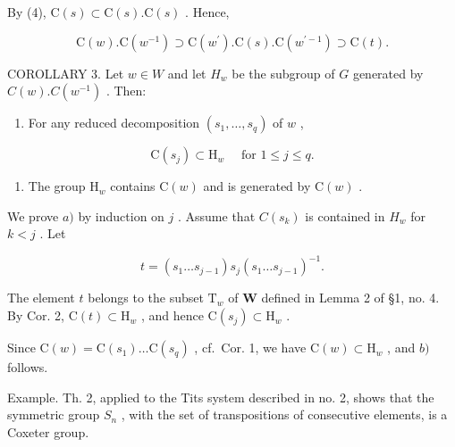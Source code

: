 By (4), \(\mathrm{C}(s) \subset \mathrm{C}(s). \mathrm{C}(s)\) . Hence,

\[
\mathrm{C} (w). \mathrm{C} (w ^ {- 1}) \supset \mathrm{C} (w ^ {\prime}). \mathrm{C} (s). \mathrm{C} (w ^ {\prime - 1}) \supset \mathrm{C} (t).
\]

COROLLARY 3. Let \(w \in W\) and let \(H_w\) be the subgroup of \(G\) generated by \(C(w).C(w^{-1})\) . Then:

\begin{enumerate}
\def\labelenumi{\alph{enumi})}
\tightlist
\item
  For any reduced decomposition \((s_1,\ldots ,s_q)\) of \(w\) ,
\end{enumerate}

\[
\mathrm{C} (s _ {j}) \subset \mathrm{H} _ {w} \quad \text { for } 1 \leqslant j \leqslant q.
\]

\begin{enumerate}
\def\labelenumi{\alph{enumi})}
\setcounter{enumi}{1}
\tightlist
\item
  The group \(\mathrm{H}_w\) contains \(\mathrm{C}(w)\) and is generated by \(\mathrm{C}(w)\) .
\end{enumerate}

We prove \(a)\) by induction on \(j\) . Assume that \(C(s_k)\) is contained in \(H_w\) for \(k < j\) . Let

\[
t = (s _ {1} \dots s _ {j - 1}) s _ {j} (s _ {1} \dots s _ {j - 1}) ^ {- 1}.
\]

The element \(t\) belongs to the subset \(\mathrm{T}_w\) of \(\mathbf{W}\) defined in Lemma 2 of §1, no. 4. By Cor. 2, \(\mathrm{C}(t) \subset \mathrm{H}_w\) , and hence \(\mathrm{C}(s_j) \subset \mathrm{H}_w\) .

Since \(\mathrm{C}(w) = \mathrm{C}(s_1) \ldots \mathrm{C}(s_q)\) , cf.~Cor. 1, we have \(\mathrm{C}(w) \subset \mathrm{H}_w\) , and \(b)\) follows.

Example. Th. 2, applied to the Tits system described in no. 2, shows that the symmetric group \(S_{n}\) , with the set of transpositions of consecutive elements, is a Coxeter group.

